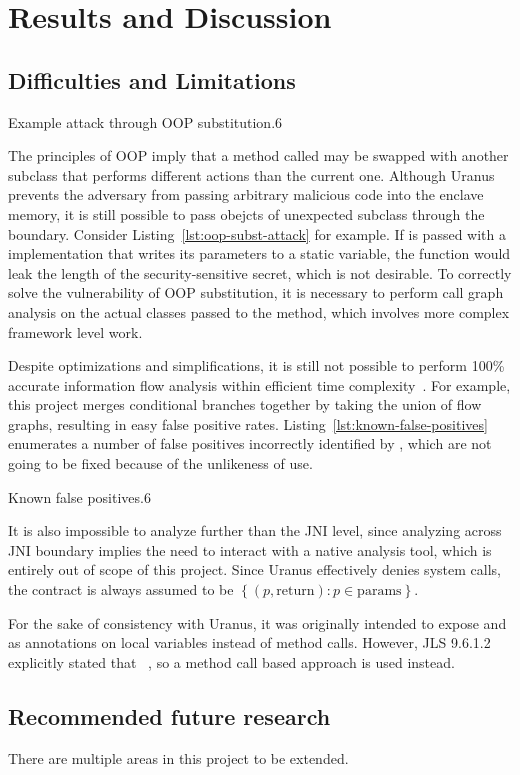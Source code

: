 \section{Results and Discussion}\label{sec:results-and-discussion}

\subsection{Difficulties and Limitations}\label{subsec:difficulties-and-limitations}
{Example attack through OOP substitution}{.6}

The principles of \ac{OOP} imply that a method called may be swapped with another subclass
that performs different actions than the current one.
Although Uranus prevents the adversary
from passing arbitrary malicious code into the enclave memory,
it is still possible to pass obejcts of unexpected subclass
through the  boundary.
Consider Listing~\ref{lst:oop-subst-attack} for example.
If  is passed with a  implementation
that writes its parameters to a static variable,
the function would leak the length of the security-sensitive secret,
which is not desirable.
To correctly solve the vulnerability of \ac{OOP} substitution,
it is necessary to perform call graph analysis on the actual classes passed to the method,
which involves more complex framework level work.

Despite optimizations and simplifications,
it is still not possible to perform 100\% accurate information flow analysis
within efficient time complexity~\cite{SmithGeoffrey2007PoSI}.
For example, this project merges conditional branches together
by taking the union of flow graphs,
resulting in easy false positive rates.
Listing~\ref{lst:known-false-positives} enumerates a number of false positives
incorrectly identified by \pname{},
which are not going to be fixed because of the unlikeness of use.

{Known false positives}{.6}

It is also impossible to analyze further than the \ac{JNI} level,
since analyzing across \ac{JNI} boundary implies
the need to interact with a native analysis tool,
which is entirely out of scope of this project.
Since Uranus effectively denies system calls,
the contract is always assumed to be
$\left\{ (p, \text{return}) : p \in \text{params} \right\}$.

For the sake of consistency with Uranus,
it was originally intended to expose  and 
as annotations on local variables instead of method calls.
However, \ac{JLS} 9.6.1.2 explicitly stated that
~\cite{jls},
so a method call based approach is used instead.

\subsection{Recommended future research}\label{subsec:recommended-future-research}
There are multiple areas in this project to be extended.


